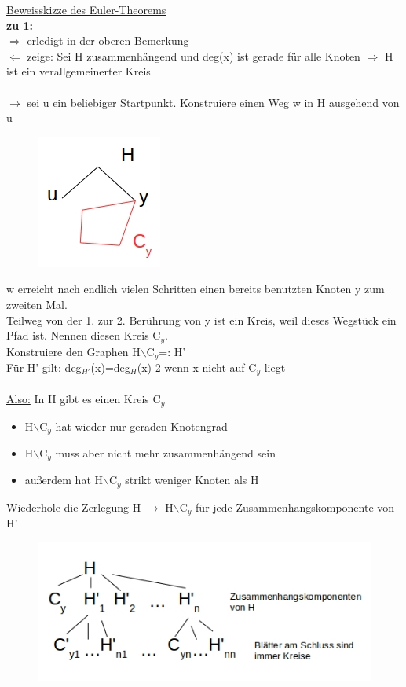 \underline{Beweisskizze des Euler-Theorems}\\
\textbf{zu 1:}\\
$\Rightarrow$ erledigt in der oberen Bemerkung\\
$\Leftarrow$ zeige: Sei H zusammenhängend und deg(x) ist gerade für alle Knoten $\Rightarrow$ H ist ein verallgemeinerter Kreis
\\\\
$\rightarrow$ sei u ein beliebiger Startpunkt. Konstruiere einen Weg w in H ausgehend von u
\begin{figure}[htp]
\centering
\includegraphics[scale=0.75]{lectures/161104/pix/pic2.jpg}
\end{figure}
\newpage
w erreicht nach endlich vielen Schritten einen bereits benutzten Knoten y zum zweiten Mal.\\
Teilweg von der 1. zur 2. Berührung von y ist ein Kreis, weil dieses Wegstück ein Pfad ist. Nennen diesen Kreis C$_y$.\\
Konstruiere den Graphen H$\backslash$C$_y$=: H'\\
Für H' gilt: deg$_{H'}$(x)=deg$_H$(x)-2 wenn x nicht auf C$_y$ liegt
\\\\
\underline{Also:} In H gibt es einen Kreis C$_y$
\begin{itemize}
	\item H$\backslash$C$_y$ hat wieder nur geraden Knotengrad
	\item H$\backslash$C$_y$ muss aber nicht mehr zusammenhängend sein
	\item außerdem hat H$\backslash$C$_y$ strikt weniger Knoten als H
\end{itemize}

Wiederhole die Zerlegung H $\rightarrow$ H$\backslash$C$_y$ für jede Zusammenhangskomponente von H'
\begin{figure}[htp]
\centering
\includegraphics[scale=1.00]{lectures/161104/pix/pic3.jpg}
\end{figure}

